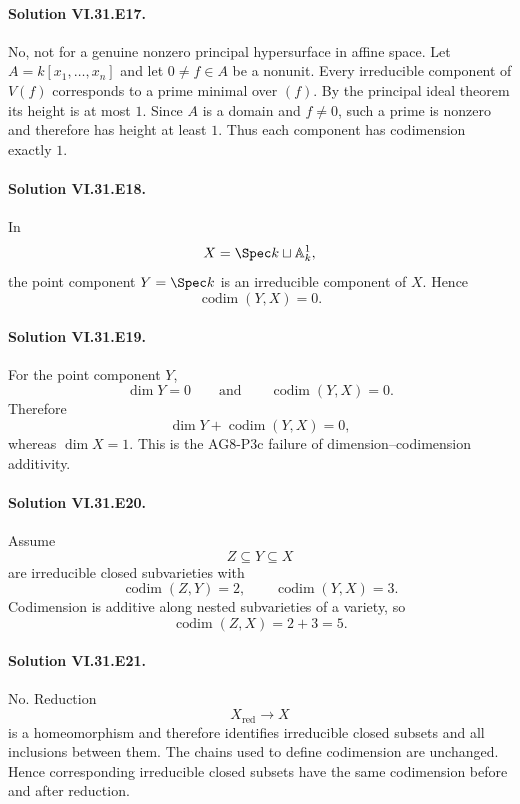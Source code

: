 \paragraph{Solution VI.31.E17.}
No, not for a genuine nonzero principal hypersurface in affine space.  Let \(A=k[x_1,\ldots,x_n]\) and let
\(0\ne f\in A\) be a nonunit.  Every irreducible component of \(V(f)\) corresponds to a prime minimal over
\((f)\).  By the principal ideal theorem its height is at most \(1\).  Since \(A\) is a domain and \(f\ne0\),
such a prime is nonzero and therefore has height at least \(1\).  Thus each component has codimension exactly
\(1\).

\paragraph{Solution VI.31.E18.}
In
\[
X=\Spec k\sqcup\mathbb A^1_k,
\]
the point component \(Y=\Spec k\) is an irreducible component of \(X\).  Hence
\[
\boxed{\operatorname{codim}(Y,X)=0}.
\]

\paragraph{Solution VI.31.E19.}
For the point component \(Y\),
\[
\dim Y=0
\qquad\text{and}\qquad
\operatorname{codim}(Y,X)=0.
\]
Therefore
\[
\boxed{\dim Y+\operatorname{codim}(Y,X)=0},
\]
whereas \(\dim X=1\).  This is the AG8-P3c failure of dimension--codimension additivity.

\paragraph{Solution VI.31.E20.}
Assume
\[
Z\subseteq Y\subseteq X
\]
are irreducible closed subvarieties with
\[
\operatorname{codim}(Z,Y)=2,
\qquad
\operatorname{codim}(Y,X)=3.
\]
Codimension is additive along nested subvarieties of a variety, so
\[
\operatorname{codim}(Z,X)=2+3=\boxed{5}.
\]

\paragraph{Solution VI.31.E21.}
No.  Reduction
\[
X_{\mathrm{red}}\to X
\]
is a homeomorphism and therefore identifies irreducible closed subsets and all inclusions between them.  The
chains used to define codimension are unchanged.  Hence corresponding irreducible closed subsets have the same
codimension before and after reduction.

